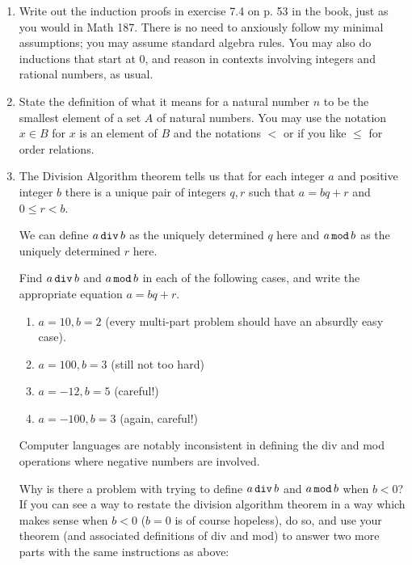 \documentclass[12pt]{article}
\begin{document}
\begin{enumerate}


\item Write out the induction proofs in exercise 7.4 on p. 53 in the book, just as you would in Math 187.  There is no need to anxiously follow my minimal assumptions; you may assume standard algebra rules.  You may also do inductions that start at 0, and reason in contexts involving integers and rational numbers, as usual.

\item State the definition of what it means for a natural number $n$ to be the smallest element of a set $A$ of natural numbers.   You may use the notation $x \in B$ for $x$ is an element of $B$ and the notations $<$ or if you like $\leq$ for order relations.

\item The Division Algorithm theorem tells us that for each integer $a$ and positive integer $b$ there is a unique pair of integers $q,r$ such that
$a=bq+r$ and $0 \leq r <b$.

We can define $a\, {\tt div}\, b$ as the uniquely determined $q$ here and $a\, {\tt mod}\, b$ as the uniquely determined $r$ here.

Find $a \,{\tt div}\, b$ and $a \,{\tt mod}\, b$ in each of the following cases, and write the appropriate equation $a=bq+r$.

\begin{enumerate}

\item $a=10, b=2$  (every multi-part problem should have an absurdly easy case).

\item $a=100, b=3$ (still not too hard)

\item $a = -12, b=5$ (careful!)

\item $a=-100, b =3$ (again, careful!)

\end{enumerate}

Computer languages are notably inconsistent in defining the div and mod operations where negative numbers are involved.

Why is there a problem with trying to define $a \,{\tt div}\, b$ and $a \,{\tt mod}\, b$ when $b<0$?  If you can see a way to restate the division algorithm theorem in a way which makes sense when $b<0$ ($b=0$ is of course hopeless), do so, and use your theorem (and associated definitions of div and mod) to answer two more parts with the same instructions as above:


\end{enumerate}
\end{document}

